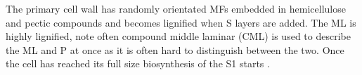 The primary cell wall has randomly orientated MFs embedded
in hemicellulose and pectic compounds and becomes lignified when S layers are added.
The ML is highly lignified, note often compound middle laminar (CML) is used to describe
the ML and P at once as it is often hard to distinguish between the two. Once the cell has reached its
full size biosynthesis of the S1 starts \cite{fromm2013cellular}.